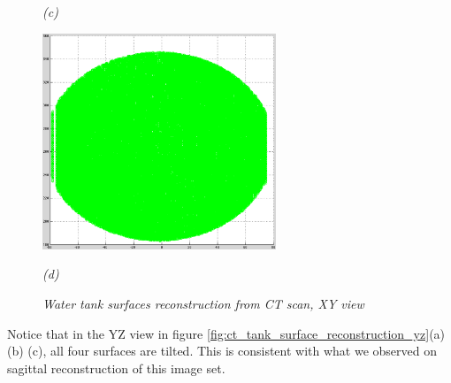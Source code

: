 \begin{figure}[htb]
\begin{minipage}[b]{2.75in}
    \centerline{\emph{(c)}}
  \end{minipage}\medskip
  \begin{minipage}[b]{2.75in}
    \centering
    \centerline{\mbox{\includegraphics[width=2.75in]{data_extraction/images/surface_plane/inferior_outside/xy.eps}}}
    \centerline{\emph{(d)}}
  \end{minipage}
  \caption{\emph{Water tank surfaces reconstruction from CT scan, XY view}}
  \label{fig:ct_tank_surface_reconstruction_xy}
\end{figure}

Notice that in the YZ view in figure \ref{fig:ct_tank_surface_reconstruction_yz}(a) (b) (c), 
all four surfaces are tilted. This is consistent with what we observed on sagittal reconstruction 
of this image set. 

